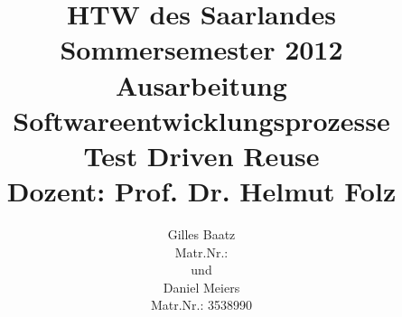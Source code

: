 

\title{%
\large HTW des Saarlandes\\
Sommersemester 2012\\
Ausarbeitung Softwareentwicklungsprozesse\\[10mm]
{\LARGE Test Driven Reuse}\\[10mm]
Dozent: Prof. Dr. Helmut Folz}

\author{%
Gilles Baatz\\
Matr.Nr.: \\[5mm]
und\\[5mm]
Daniel Meiers\\
Matr.Nr.: 3538990
}



\maketitle
 
\tableofcontents
\listoffigures











\printbibliography

